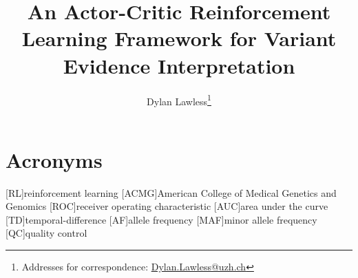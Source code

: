 
\usepackage[printonlyused,withpage,nohyperlinks]{acronym}

\newcommand{\boxlabel}[1]{%
  \refstepcounter{myboxcounter}%
  \label{#1}%
}

\title{An Actor-Critic Reinforcement Learning Framework for Variant Evidence Interpretation}

\author[1]{Dylan Lawless\thanks{Addresses for correspondence: \href{mailto:Dylan.Lawless@uzh.ch}{Dylan.Lawless@uzh.ch}}}

\maketitle
\justify

\section*{Acronyms}
\renewenvironment{description} %
{\list{}{\labelwidth0pt\itemindent-\leftmargin
    \parsep-1em\itemsep0pt\let\makelabel\descriptionlabel}}
               {\endlist}
\begin{acronym} 
[RL]{reinforcement learning}
[ACMG]{American College of Medical Genetics and Genomics}
[ROC]{receiver operating characteristic}
[AUC]{area under the curve}
[TD]{temporal-difference}
[AF]{allele frequency}
[MAF]{minor allele frequency}
[QC]{quality control}
\end{acronym}

